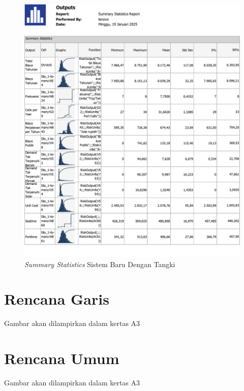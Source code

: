 \begin{figure}[!ht]
    \centering
    \includegraphics[width=\linewidth,height=\textheight,keepaspectratio]{lampiran/summary-tangki.jpg}
    \caption*{\emph{Summary Statistics} Sistem Baru Dengan Tangki}
\end{figure}

\section*{Rencana Garis}
\label{sec:rencana-garis}

Gambar akan dilampirkan dalam kertas A3

% 
% 



\section*{Rencana Umum}
\label{sec:rencana-umum}

Gambar akan dilampirkan dalam kertas A3
% 

% 

